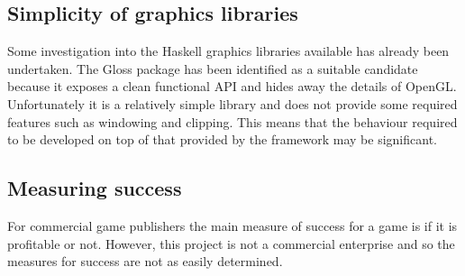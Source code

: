 \subsection{Simplicity of graphics libraries}

Some investigation into the Haskell graphics libraries available has already been undertaken.
The Gloss package has been identified as a suitable candidate because it exposes a clean
functional API and hides away the details of OpenGL. Unfortunately it is a relatively simple
library and does not provide some required features such as windowing and clipping.
This means that the behaviour required to be developed on top of that provided by the framework may be significant.

\subsection{Measuring success}

For commercial game publishers the main measure of success for a game is if it
is profitable or not. However, this project is not a commercial enterprise and
so the measures for success are not as easily determined.
